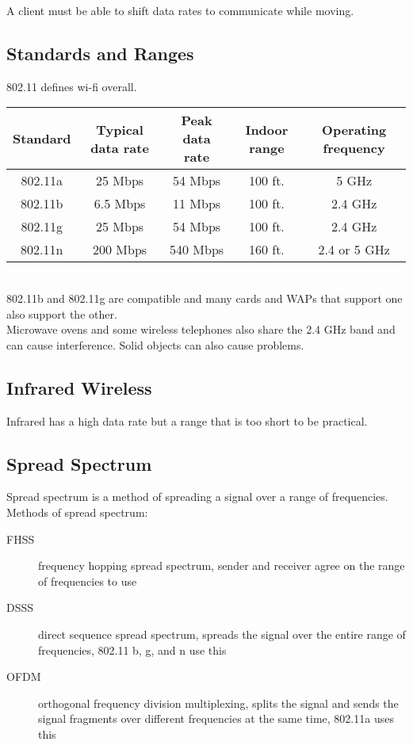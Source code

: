 A client must be able to shift data rates to communicate while moving.

\subsection{Standards and Ranges}

802.11 defines wi-fi overall.\\

\begin{tabular}{ | c | c | c | c | c | }
\hline
Standard & Typical data rate & Peak data rate & Indoor range & Operating frequency\\ \hline
802.11a & 25 Mbps  & 54 Mbps  & 100 ft. & 5 GHz \\ \hline
802.11b & 6.5 Mbps & 11 Mbps  & 100 ft. & 2.4 GHz \\ \hline
802.11g & 25 Mbps  & 54 Mbps  & 100 ft. & 2.4 GHz \\ \hline
802.11n & 200 Mbps & 540 Mbps & 160 ft. & 2.4 or 5 GHz \\ \hline
\end{tabular}\\

802.11b and 802.11g are compatible and many cards and WAPs that support one
also support the other.\\

Microwave ovens and some wireless telephones also share the 2.4 GHz band
and can cause interference. Solid objects can also cause problems.

\subsection{Infrared Wireless}

Infrared has a high data rate but a range that is too short to be practical.

\subsection{Spread Spectrum}

Spread spectrum is a method of spreading a signal over a range of frequencies.\\

Methods of spread spectrum:

\begin{description}

\item[FHSS]
frequency hopping spread spectrum, sender and receiver agree on the range of
frequencies to use

\item[DSSS]
direct sequence spread spectrum, spreads the signal over the entire range of
frequencies, 802.11 b, g, and n use this

\item[OFDM]
orthogonal frequency division multiplexing, splits the signal and sends the
signal fragments over different frequencies at the same time, 802.11a uses
this

\end{description}

